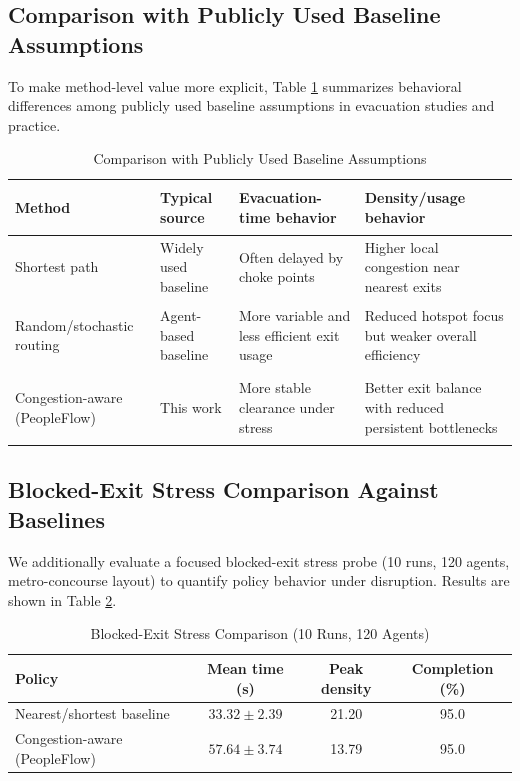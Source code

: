\documentclass[nolineno]{ieeeaccess}
\begin{document}
\subsection{Comparison with Publicly Used Baseline Assumptions}
To make method-level value more explicit, Table \ref{tab:routing_assumptions} summarizes behavioral differences among publicly used baseline assumptions in evacuation studies and practice.

\begin{table}[!htbp]
\centering
\caption{Comparison with Publicly Used Baseline Assumptions}
\label{tab:routing_assumptions}
{\footnotesize
\setlength{\tabcolsep}{3pt}
\begin{tabular}{>{\bfseries\raggedright\arraybackslash}p{1.95cm} >{\raggedright\arraybackslash}p{1.30cm} >{\raggedright\arraybackslash}p{1.70cm} >{\raggedright\arraybackslash}p{1.35cm}}
\toprule
Method & Typical source & Evacuation-time behavior & Density/\allowbreak usage behavior \\
\midrule
Shortest path & Widely used baseline \cite{path_planning} & Often delayed by choke points & Higher local congestion near nearest exits \\
Random/\allowbreak stochastic routing & Agent-based baseline \cite{pan2007} & More variable and less efficient exit usage & Reduced hotspot focus but weaker overall efficiency \\
Congestion-aware (PeopleFlow) & This work & More stable clearance under stress & Better exit balance with reduced persistent bottlenecks \\
\bottomrule
\end{tabular}
}
\end{table}

\subsection{Blocked-Exit Stress Comparison Against Baselines}
We additionally evaluate a focused blocked-exit stress probe (10 runs, 120 agents, metro-concourse layout) to quantify policy behavior under disruption. Results are shown in Table \ref{tab:blocked_policy_comparison}.

\begin{table}[!htbp]
\centering
\caption{Blocked-Exit Stress Comparison (10 Runs, 120 Agents)}
\label{tab:blocked_policy_comparison}
{\footnotesize
\setlength{\tabcolsep}{3pt}
\begin{tabular}{>{\raggedright\arraybackslash}p{2.2cm}ccc}
\toprule
\textbf{Policy} & \textbf{Mean time (s)} & \textbf{Peak density} & \textbf{Completion (\%)} \\
\midrule
Nearest/shortest baseline & $33.32 \pm 2.39$ & 21.20 & 95.0 \\
Congestion-aware (PeopleFlow) & $57.64 \pm 3.74$ & 13.79 & 95.0 \\
\bottomrule
\end{tabular}
}
\end{table}
\end{document}
